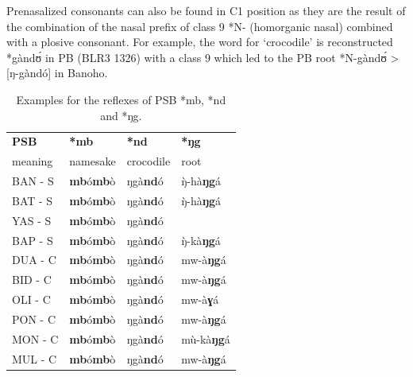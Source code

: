 \documentclass[output=paper,colorlinks,citecolor=brown
]{langscibook}
\begin{document}
\clearpage
Prenasalized consonants can also be found in C1 position as they are the result of the combination of the nasal prefix of class 9 *N- (homorganic nasal) combined with a plosive consonant. For example, the word for `crocodile' is reconstructed *gàndʊ́ in PB (BLR3 1326) with a class 9 which led to the PB root *N-gàndʊ́ > [ŋ-gàndó] in Banoho. 

\begin{table}
\caption{Examples for the reflexes of PSB *mb, *nd and *ŋg.}
\label{tab:grollemundbrownrule:prenasals}
 \begin{tabular}{llll}
  \lsptoprule
\textbf{PSB}              & \textbf{*mb}               & \textbf{*nd}                & \textbf{*ŋg}           \\
 {{meaning}} & {{namesake}} & {{crocodile}} & {{root}} \\
\midrule
BAN - S                   & \textbf{mb}ó\textbf{mb}ò                   & ŋgà\textbf{nd}ó                    & ŋ̀-hà\textbf{ŋg}á             \\
BAT - S                   & \textbf{mb}ó\textbf{mb}ò                   & ŋgà\textbf{nd}ó                    & ŋ̀-hà\textbf{ŋg}á             \\
YAS - S                   & \textbf{mb}ó\textbf{mb}ò                   & ŋgà\textbf{nd}ó                    &                        \\
BAP - S                   & \textbf{mb}ó\textbf{mb}ò                   & ŋgà\textbf{nd}ó                    & ŋ̀-kà\textbf{ŋg}á             \\
DUA - C                   & \textbf{mb}ó\textbf{mb}ò                   & ŋgà\textbf{nd}ó                    & mw-à\textbf{ŋg}á              \\
BID - C                   & \textbf{mb}ó\textbf{mb}ò                   & ŋgà\textbf{nd}ó                    & mw-à\textbf{ŋg}á              \\
OLI - C                   & \textbf{mb}ó\textbf{mb}ò                   & ŋgà\textbf{nd}ó                    & mw-à\textbf{ɣ}á               \\
PON - C                   & \textbf{mb}ó\textbf{mb}ò                   & ŋgà\textbf{nd}ó                    & mw-à\textbf{ŋg}á              \\
MON - C                   & \textbf{mb}ó\textbf{mb}ò                   & ŋgà\textbf{nd}ó                    & mù-kà\textbf{ŋg}á            \\
MUL - C                   & \textbf{mb}ó\textbf{mb}ò                   & ŋgà\textbf{nd}ó                    & mw-à\textbf{ŋg}á              \\

\end{tabular}
\end{table}
\end{document}
